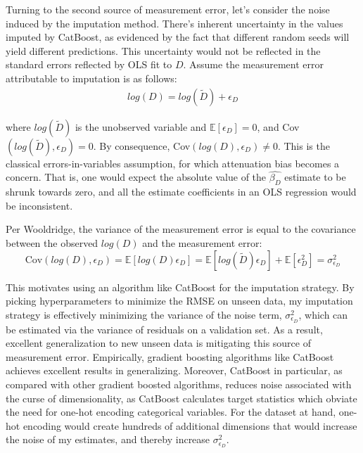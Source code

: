 \documentclass[a4paper,12pt]{article}
\begin{document}
Turning to the second source of measurement error, let's consider the noise induced by the imputation method. There's inherent uncertainty in the values imputed by CatBoost, as evidenced by the fact that different random seeds will yield different predictions. This uncertainty would not be reflected in the standard errors reflected by OLS fit to $D$. Assume the measurement error attributable to imputation is as follows:
\begin{align*}
log(D) = log(\tilde{D}) + \epsilon_{D}
\end{align*}

where $log(\tilde{D})$ is the unobserved variable and $\mathbb{E}[\epsilon_{D}]=0$, and Cov$(log(\tilde{D}), \epsilon_{D}) = 0$. By consequence, Cov$(log({D}), \epsilon_{D}) \neq 0$. This is the classical errors-in-variables assumption, for which attenuation bias becomes a concern.\cite{wooldridge2010econometric} That is, one would expect the absolute value of the $\hat{\beta_{D}}$ estimate to be shrunk towards zero, and all the estimate coefficients in an OLS regression would be inconsistent.\cite{wooldridge2010econometric} 

Per Wooldridge, the variance of the measurement error is equal to the covariance between the observed $log(D)$ and the measurement error:\cite{wooldridge2010econometric}
\[
\text{Cov}(log(D), \epsilon_{D}) = \mathbb{E}[log(D)\epsilon_{D}] = \mathbb{E}[log(\tilde{D})\epsilon_{D}] + \mathbb{E}[\epsilon^2_{D}] = \sigma^2_{\epsilon_{D}}
\]

This motivates using an algorithm like CatBoost for the imputation strategy. By picking hyperparameters to minimize the RMSE on unseen data, my imputation strategy is effectively minimizing the variance of the noise term, $\sigma^2_{\epsilon_{D}}$, which can be estimated via the variance of residuals on a validation set. As a result, excellent generalization to new unseen data is mitigating this source of measurement error. Empirically, gradient boosting algorithms like CatBoost achieves excellent results in generalizing.\cite{bentejac2021comparative} Moreover, CatBoost in particular, as compared with other gradient boosted algorithms, reduces noise associated with the curse of dimensionality, as CatBoost calculates target statistics which obviate the need for one-hot encoding categorical variables. For the dataset at hand, one-hot encoding would create hundreds of additional dimensions that would increase the noise of my estimates, and thereby increase $\sigma^2_{\epsilon_{D}}$. 
\end{document}
